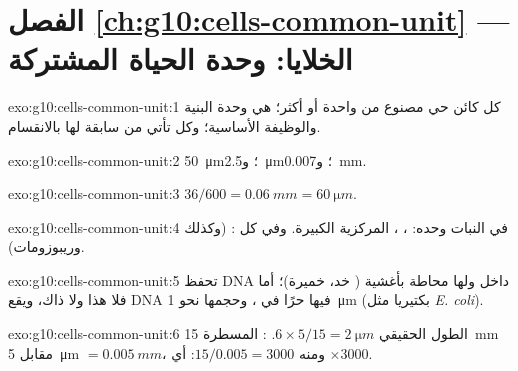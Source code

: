 \section*{الفصل \ref{ch:g10:cells-common-unit} --- الخلايا: وحدة الحياة المشتركة}

\begin{solution}{exo:g10:cells-common-unit:1}
كل كائن حي مصنوع من  واحدة أو أكثر؛  هي وحدة البنية
والوظيفة الأساسية؛ وكل  تأتي من  سابقة لها بالانقسام.
\end{solution}

\begin{solution}{exo:g10:cells-common-unit:2}
\qty{50}{\micro m}؛ و\qty{2.5}{\micro m}؛ و\qty{0.007}{mm}.
\end{solution}

\begin{solution}{exo:g10:cells-common-unit:3}
$36/600 = \qty{0.06}{mm} = \qty{60}{\micro m}$.
\end{solution}

\begin{solution}{exo:g10:cells-common-unit:4}
في النبات وحده: ، ،  المركزية
الكبيرة. وفي كل :  (وكذلك  وريبوزومات).
\end{solution}

\begin{solution}{exo:g10:cells-common-unit:5}
 تحفظ DNA داخل  ولها  محاطة بأغشية
( خد، خميرة)؛ أما  فلا هذا ولا ذاك، ويقع
DNA فيها حرًا في ، وحجمها نحو \qty{1}{\micro m} (بكتيريا
مثل \emph{E. coli}).
\end{solution}

\begin{solution}{exo:g10:cells-common-unit:6}
الطول الحقيقي $6 \times 5/15 = \qty{2}{\micro m}$. : المسطرة
\qty{15}{mm} مقابل \qty{5}{\micro m} $= \qty{0.005}{mm}$، ومنه
$15/0.005 = 3000$: أي $\times 3000$.
\end{solution}

